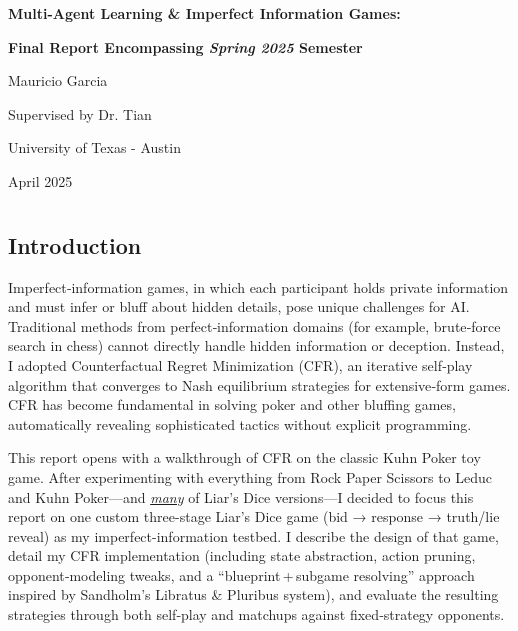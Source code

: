 \documentclass[
]{article}
\author{}
\date{}
\begin{document}
\textbf{Multi-Agent Learning \& Imperfect Information Games:}

\textbf{Final Report Encompassing \emph{Spring 2025} Semester}

Mauricio Garcia

Supervised by Dr. Tian

University of Texas - Austin

April 2025

\section*{}\label{section}

\subsection*{}\label{section-1}

\subsection*{Introduction}\label{introduction}

Imperfect‑information games, in which each participant holds private
information and must infer or bluff about hidden details, pose unique
challenges for AI. Traditional methods from perfect‑information domains
(for example, brute‑force search in chess) cannot directly handle hidden
information or deception. Instead, I adopted Counterfactual Regret
Minimization (CFR), an iterative self‑play algorithm that converges to
Nash equilibrium strategies for extensive‑form games. CFR has become
fundamental in solving poker and other bluffing games, automatically
revealing sophisticated tactics without explicit programming.

This report opens with a walkthrough of CFR on the classic Kuhn Poker
toy game. After experimenting with everything from Rock Paper Scissors
to Leduc and Kuhn Poker---and \emph{\ul{many}} of Liar's Dice
versions---I decided to focus this report on one custom three-stage
Liar's Dice game (bid → response → truth/lie reveal) as my
imperfect-information testbed. I describe the design of that game,
detail my CFR implementation (including state abstraction, action
pruning, opponent‑modeling tweaks, and a ``blueprint\,+\,subgame
resolving'' approach inspired by Sandholm's Libratus \& Pluribus
system), and evaluate the resulting strategies through both self‑play
and matchups against fixed‑strategy opponents.
\end{document}
